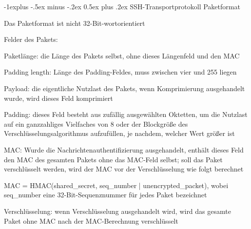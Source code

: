 \documentclass[a4paper]{article}
\makeatletter
\renewcommand{\subsection}{\@startsection{subsection}{2}{0mm}%
 {-1explus -.5ex minus -.2ex}%
 {0.5ex plus .2ex}%
 {\normalfont\normalsize\bfseries}}
\makeatother
\begin{document}
\begin{multicols}{3}
\begin{itemize*}
            \subsection{SSH-Transportprotokoll
                  Paketformat}
            \begin{itemize*}
                  \item       Das Paketformat ist nicht 32-Bit-wortorientiert
                  \item       Felder des Pakets:
                  \begin{itemize*}
                        \item Paketlänge: die Länge des Pakets selbst, ohne dieses Längenfeld und den MAC
                        \item Padding length: Länge des Padding-Feldes, muss zwischen vier und 255 liegen
                        \item Payload: die eigentliche Nutzlast des Pakets, wenn Komprimierung ausgehandelt wurde, wird dieses Feld komprimiert
                        \item Padding: dieses Feld besteht aus zufällig ausgewählten Oktetten, um die Nutzlast auf ein ganzzahliges Vielfaches von 8 oder der Blockgröße des Verschlüsselungsalgorithmus aufzufüllen, je nachdem, welcher Wert größer ist
                        \item MAC: Wurde die Nachrichtenauthentifizierung ausgehandelt, enthält dieses Feld den MAC des gesamten Pakets ohne das MAC-Feld selbst; soll das Paket verschlüsselt werden, wird der MAC vor der Verschlüsselung wie folgt berechnet
                        \begin{itemize*} \item MAC = HMAC(shared\_secret, seq\_number \textbar| unencrypted\_packet), wobei seq\_number eine 32-Bit-Sequenznummer für jedes Paket bezeichnet \end{itemize*}
                  \end{itemize*}
                  \item       Verschlüsselung: wenn Verschlüsselung ausgehandelt wird, wird das
                  gesamte Paket ohne MAC nach der MAC-Berechnung verschlüsselt
            \end{itemize*}


\end{itemize*}
\end{multicols}
\end{document}
